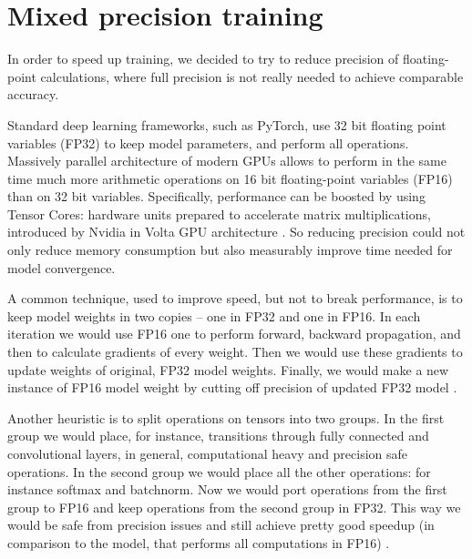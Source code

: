 \documentclass[licencjacka,en]{pracamgr}
\begin{document}
    
    
    
    
    
    
    
    
    
    
    	\section{Mixed precision training}
	In order to speed up training, we decided to try to reduce precision of floating-point calculations, where full precision is not really needed to achieve comparable accuracy.
	
	Standard deep learning frameworks, such as PyTorch, use 32 bit floating point variables (FP32) to keep model parameters, and perform all operations. Massively parallel architecture of modern GPUs allows to perform in the same time much more arithmetic operations on 16 bit floating-point variables (FP16) than on 32 bit variables.
	Specifically, performance can be boosted by using Tensor Cores: hardware units prepared to accelerate matrix multiplications, introduced by Nvidia in Volta GPU architecture \cite{MPT}.
	So reducing precision could not only reduce memory consumption but also measurably improve time needed for model convergence.
	
	A common technique, used to improve speed, but not to break performance, is to keep model weights in two copies -- one in FP32 and one in FP16. In each iteration we would use FP16 one to perform forward, backward propagation, and then to calculate gradients of every weight. Then we would use these gradients to update weights of original, FP32 model weights. Finally, we would make a new instance of FP16 model weight by cutting off precision of updated FP32 model \cite{APEX}.
	
	Another heuristic is to split operations on tensors into two groups. In the first group we would place, for instance, transitions through fully connected and convolutional layers, in general, computational heavy and precision safe operations. In the second group we would place all the other operations: for instance softmax and batchnorm. Now we would port operations from the first group to FP16 and keep operations from the second group in FP32. This way we would be safe from precision issues and still achieve pretty good speedup (in comparison to the model, that performs all computations in FP16) \cite{APEX}.
	
\end{document}
